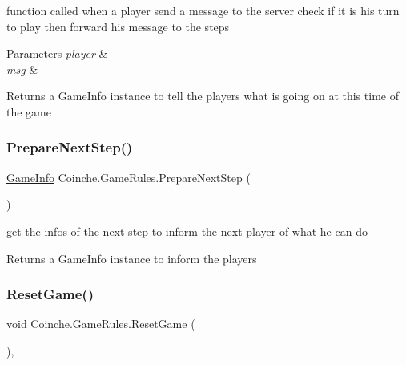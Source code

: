 function called when a player send a message to the server check if it is his turn to play then forward his message to the steps 


\begin{DoxyParams}{Parameters}
{\em player} & \\
\hline
{\em msg} & \\
\hline
\end{DoxyParams}
\begin{DoxyReturn}{Returns}
a Game\+Info instance to tell the players what is going on at this time of the game
\end{DoxyReturn}
\mbox{\label{class_coinche_1_1_game_rules_a0789b63674da204c957ba7b98e53db4b}} 
\subsubsection{\texorpdfstring{Prepare\+Next\+Step()}{PrepareNextStep()}}
{\footnotesize\ttfamily \hyperlink{class_coinche_1_1_tools_1_1_game_info}{Game\+Info} Coinche.\+Game\+Rules.\+Prepare\+Next\+Step (\begin{DoxyParamCaption}{ }\end{DoxyParamCaption})\hspace{0.3cm}{\ttfamily [inline]}}



get the infos of the next step to inform the next player of what he can do 

\begin{DoxyReturn}{Returns}
a Game\+Info instance to inform the players
\end{DoxyReturn}
\mbox{\label{class_coinche_1_1_game_rules_a9161e5dc677ba4477f3bdd9ca3c7c8f8}} 
\subsubsection{\texorpdfstring{Reset\+Game()}{ResetGame()}}
{\footnotesize\ttfamily void Coinche.\+Game\+Rules.\+Reset\+Game (\begin{DoxyParamCaption}{ }\end{DoxyParamCaption})\hspace{0.3cm}{\ttfamily [inline]}, {\ttfamily [private]}}



